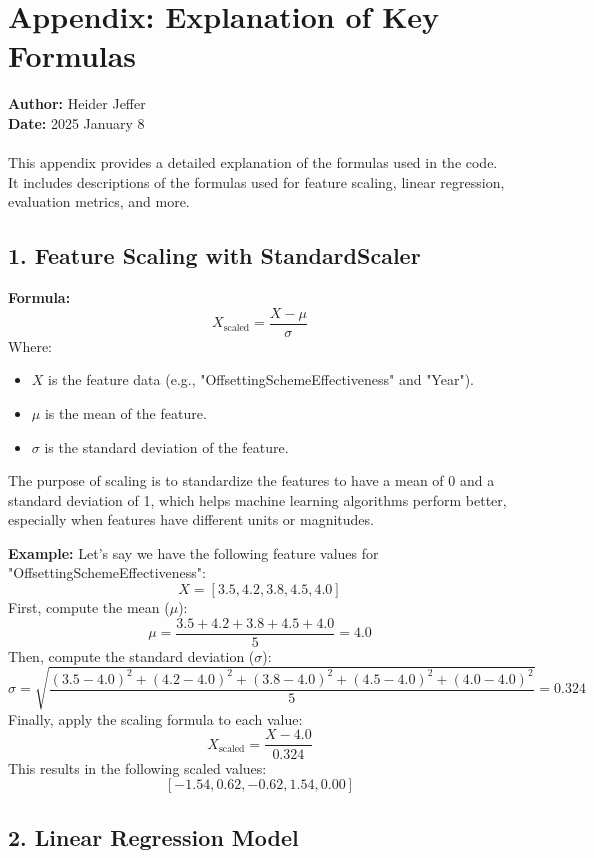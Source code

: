 \documentclass[12pt]{article}
\begin{document}
\section*{Appendix: Explanation of Key Formulas}

\textmd{\textbf{Author:} Heider Jeffer}\\
\textmd{\textbf{Date:} 2025 January 8}\\ \\




This appendix provides a detailed explanation of the formulas used in the code. It includes descriptions of the formulas used for feature scaling, linear regression, evaluation metrics, and more.

\subsection*{1. Feature Scaling with StandardScaler}

\textbf{Formula:}  
\[
X_{\text{scaled}} = \frac{X - \mu}{\sigma}
\]
Where:
\begin{itemize}
    \item \( X \) is the feature data (e.g., "OffsettingSchemeEffectiveness" and "Year").
    \item \( \mu \) is the mean of the feature.
    \item \( \sigma \) is the standard deviation of the feature.
\end{itemize}

The purpose of scaling is to standardize the features to have a mean of 0 and a standard deviation of 1, which helps machine learning algorithms perform better, especially when features have different units or magnitudes.

\textbf{Example:}  
Let’s say we have the following feature values for "OffsettingSchemeEffectiveness":
\[
X = [3.5, 4.2, 3.8, 4.5, 4.0]
\]
First, compute the mean (\(\mu\)):
\[
\mu = \frac{3.5 + 4.2 + 3.8 + 4.5 + 4.0}{5} = 4.0
\]
Then, compute the standard deviation (\(\sigma\)):
\[
\sigma = \sqrt{\frac{(3.5 - 4.0)^2 + (4.2 - 4.0)^2 + (3.8 - 4.0)^2 + (4.5 - 4.0)^2 + (4.0 - 4.0)^2}{5}} = 0.324
\]
Finally, apply the scaling formula to each value:
\[
X_{\text{scaled}} = \frac{X - 4.0}{0.324}
\]
This results in the following scaled values:
\[
[ -1.54, 0.62, -0.62, 1.54, 0.00 ]
\]

\subsection*{2. Linear Regression Model}
\end{document}
